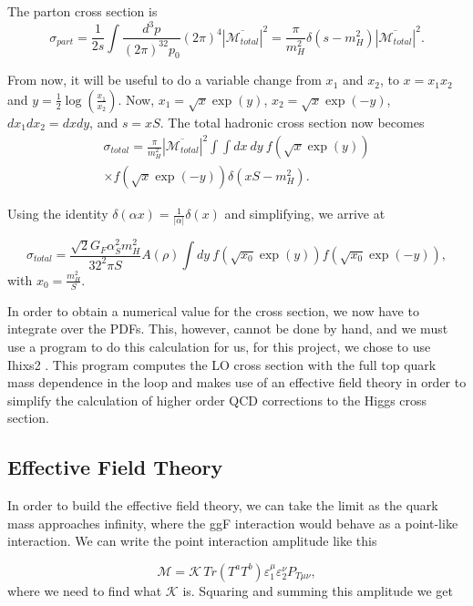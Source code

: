 \documentclass[EPJ,twocolumn]{webofc}
\begin{document}
The parton cross section is 
\begin{equation}
    \sigma_{part} =\frac{1}{2s} \int \frac{d^3p}{(2\pi)^32p_0}(2\pi)^4 |\overline{\mathcal{M}_{total}}|^2 = \frac{\pi}{m_H^2}\delta\left(s-m_H^2\right)|\overline{\mathcal{M}_{total}}|^2.
\end{equation}

From now, it will be useful to do a variable change from $x_1$ and $x_2$, to $x = x_1x_2$ and $y = \frac{1}{2}\log(\frac{x_1}{x_2})$. Now, $x_1 = \sqrt{x}\exp(y)$, $x_2 = \sqrt{x}\exp(-y)$, $dx_1dx_2 = dxdy$, and $s = xS$. The total hadronic cross section now becomes
\begin{multline}  
    \sigma_{total} = \frac{\pi}{m_H^2}|\overline{\mathcal{M}_{total}}|^2  \int\int dx~dy~ f\left(\sqrt{x}\exp(y)\right) \\ \times f\left(\sqrt{x}\exp(-y)\right)\delta\left(xS-m_H^2\right).
\end{multline}

Using the identity $\delta(\alpha x) = \frac{1}{|\alpha|}\delta(x)$ and simplifying, we arrive at

\begin{equation}
     \sigma_{total} = \frac{\sqrt{2}G_F\alpha_S^2m_H^2}{32^2\pi S}A\left(\rho\right) \int dy~ f\left(\sqrt{x_0}\exp(y)\right)f\left(\sqrt{x_0}\exp(-y)\right),
\end{equation}
with $x_0 = \frac{m_H^2}{S}$.

In order to obtain a numerical value for the cross section, we now have to integrate over the PDFs. This, however, cannot be done by hand, and we must use a program to do this calculation for us, for this project, we chose to use Ihixs2 \cite{Dulat_2018}. This program computes the LO cross section with the full top quark mass dependence in the loop and makes use of an effective field theory in order to simplify the calculation of higher order QCD corrections to the Higgs cross section.


\subsection{Effective Field Theory}
    
    In order to build the effective field theory, we can take the limit as the quark mass approaches infinity, where the ggF interaction would behave as a point-like interaction. We can write the point interaction amplitude like this

    \begin{equation}
    \mathcal{M} = \mathcal{K}\,Tr\left(T^aT^b\right)\varepsilon_1^{\mu}\varepsilon_2^{\nu} P_{T\mu\nu},
    \label{EFF amp}
\end{equation}
where we need to find what $\mathcal{K}$ is. Squaring and summing this amplitude we get
\end{document}
